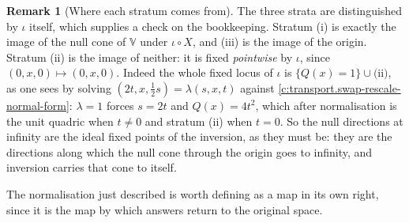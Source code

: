 \documentclass[11pt]{article}
\theoremstyle{definition}
\newtheorem{remark}[theorem]{Remark}
\theoremstyle{plain}
\begin{document}
\begin{remark}[Where each stratum comes from]\label{c:note.transport.where-each-stratum-comes}
The three strata are distinguished by $\iota$ itself, which supplies a check on the bookkeeping. Stratum (i) is exactly the image of the null cone of $\mathbb{V}$ under $\iota \circ X$, and (iii) is the image of the origin. Stratum (ii) is the image of neither: it is fixed \emph{pointwise} by $\iota$, since $(0,x,0) \mapsto (0,x,0)$. Indeed the whole fixed locus of $\iota$ is $\{Q(x) = 1\} \cup \text{(ii)}$, as one sees by solving $(2t, x, \tfrac12 s) = \lambda(s,x,t)$ against \ref{c:transport.swap-rescale-normal-form}: $\lambda = 1$ forces $s = 2t$ and $Q(x) = 4t^2$, which after normalisation is the unit quadric when $t \neq 0$ and stratum (ii) when $t = 0$. So the null directions at infinity are the ideal fixed points of the inversion, as they must be: they are the directions along which the null cone through the origin goes to infinity, and inversion carries that cone to itself.
\end{remark}

\label{c:note.transport.setting-coordinate-normal-form-descent-2}
The normalisation just described is worth defining as a map in its own right, since it is the map by which answers return to the original space.
\end{document}

